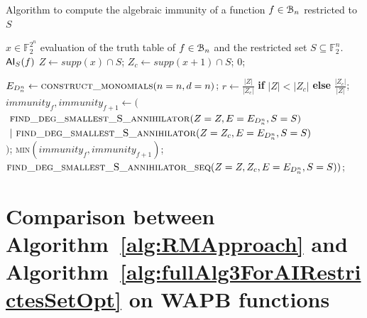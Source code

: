 \documentclass[11pt]{llncs}
\begin{document}
\begin{algorithm}
\small
    \caption{Algorithm to compute the algebraic immunity of a function $f\in \mathcal{B}_{n}$ restricted to $S$ \label{alg:fullAlg3ForAIRestrictesSetOpt}}
    \begin{algorithmic}[1]
        \Require $x\in \mathbb{F}_2^{2^n}$ evaluation of the truth table of $f\in \mathcal{B}_{n}$ and the restricted set $S\subseteq \mathbb{F}_2^n$.
		\Ensure $\mathsf{AI}_S(f)$
        \State
        \State $Z \gets supp(x)\cap S$;
        \State $Z_c \gets supp(x+1) \cap S$;
            \State \Return $0$;
        \EndIf
        \State

        \State $E_{D_n^n} \leftarrow \mbox{\textsc{construct\_monomials}}(n=n, d=n)$\footnotemark;
        \State $r\gets \frac{|Z|}{|Z_c|}$ \textbf{if} $|Z| < |Z_c|$ \textbf{else} $\frac{|Z_c|}{|Z|}$;
            \State $immunity_f, immunity_{f+1} \leftarrow ($\\
		$\ \mbox{\textsc{find\_deg\_smallest\_S\_annihilator}}(Z=Z, E=E_{D_n^n}, S=S)$\\
		$\ |\ \mbox{\textsc{find\_deg\_smallest\_S\_annihilator}}(Z=Z_c, E=E_{D_n^n}, S=S)$\\
		$)$;
            \State \Return \textsc{min}$\left(immunity_f, immunity_{f+1}\right)$;
        \Else
            \State \Return $\mbox{\textsc{find\_deg\_smallest\_S\_annihilator\_seq}}(Z=Z, Z_c, E=E_{D_n^n}, S=S))$\footnotemark;
        \EndIf
    \end{algorithmic}
\end{algorithm}


\section{Comparison between Algorithm~\ref{alg:RMApproach} and Algorithm~\ref{alg:fullAlg3ForAIRestrictesSetOpt} on WAPB functions}\label{appendix:algsComparison}
\end{document}
